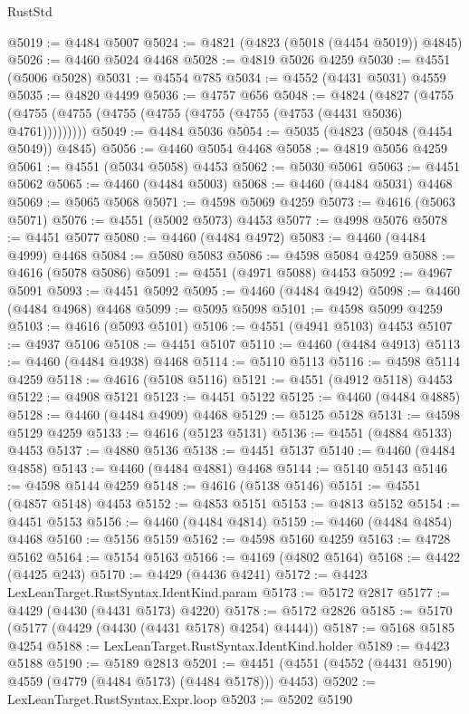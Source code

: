 \begin{lexlean}{RustStd}
\begin{coremodule}
@5019 := @4484 @5007
@5024 := @4821 (@4823 (@5018 (@4454 @5019)) @4845)
@5026 := @4460 @5024 @4468
@5028 := @4819 @5026 @4259
@5030 := @4551 (@5006 @5028)
@5031 := @4554 @785
@5034 := @4552 (@4431 @5031) @4559
@5035 := @4820 @4499
@5036 := @4757 @656
@5048 := @4824
    (@4827 (@4755 (@4755 (@4755 (@4755 (@4755 (@4755 (@4755 (@4753 (@4431 @5036) @4761)))))))))
@5049 := @4484 @5036
@5054 := @5035 (@4823 (@5048 (@4454 @5049)) @4845)
@5056 := @4460 @5054 @4468
@5058 := @4819 @5056 @4259
@5061 := @4551 (@5034 @5058) @4453
@5062 := @5030 @5061
@5063 := @4451 @5062
@5065 := @4460 (@4484 @5003)
@5068 := @4460 (@4484 @5031) @4468
@5069 := @5065 @5068
@5071 := @4598 @5069 @4259
@5073 := @4616 (@5063 @5071)
@5076 := @4551 (@5002 @5073) @4453
@5077 := @4998 @5076
@5078 := @4451 @5077
@5080 := @4460 (@4484 @4972)
@5083 := @4460 (@4484 @4999) @4468
@5084 := @5080 @5083
@5086 := @4598 @5084 @4259
@5088 := @4616 (@5078 @5086)
@5091 := @4551 (@4971 @5088) @4453
@5092 := @4967 @5091
@5093 := @4451 @5092
@5095 := @4460 (@4484 @4942)
@5098 := @4460 (@4484 @4968) @4468
@5099 := @5095 @5098
@5101 := @4598 @5099 @4259
@5103 := @4616 (@5093 @5101)
@5106 := @4551 (@4941 @5103) @4453
@5107 := @4937 @5106
@5108 := @4451 @5107
@5110 := @4460 (@4484 @4913)
@5113 := @4460 (@4484 @4938) @4468
@5114 := @5110 @5113
@5116 := @4598 @5114 @4259
@5118 := @4616 (@5108 @5116)
@5121 := @4551 (@4912 @5118) @4453
@5122 := @4908 @5121
@5123 := @4451 @5122
@5125 := @4460 (@4484 @4885)
@5128 := @4460 (@4484 @4909) @4468
@5129 := @5125 @5128
@5131 := @4598 @5129 @4259
@5133 := @4616 (@5123 @5131)
@5136 := @4551 (@4884 @5133) @4453
@5137 := @4880 @5136
@5138 := @4451 @5137
@5140 := @4460 (@4484 @4858)
@5143 := @4460 (@4484 @4881) @4468
@5144 := @5140 @5143
@5146 := @4598 @5144 @4259
@5148 := @4616 (@5138 @5146)
@5151 := @4551 (@4857 @5148) @4453
@5152 := @4853 @5151
@5153 := @4813 @5152
@5154 := @4451 @5153
@5156 := @4460 (@4484 @4814)
@5159 := @4460 (@4484 @4854) @4468
@5160 := @5156 @5159
@5162 := @4598 @5160 @4259
@5163 := @4728 @5162
@5164 := @5154 @5163
@5166 := @4169 (@4802 @5164)
@5168 := @4422 (@4425 @243)
@5170 := @4429 (@4436 @4241)
@5172 := @4423 LexLeanTarget.RustSyntax.IdentKind.param
@5173 := @5172 @2817
@5177 := @4429 (@4430 (@4431 @5173) @4220)
@5178 := @5172 @2826
@5185 := @5170 (@5177 (@4429 (@4430 (@4431 @5178) @4254) @4444))
@5187 := @5168 @5185 @4254
@5188 := LexLeanTarget.RustSyntax.IdentKind.holder
@5189 := @4423 @5188
@5190 := @5189 @2813
@5201 := @4451 (@4551 (@4552 (@4431 @5190) @4559 (@4779 (@4484 @5173) (@4484 @5178))) @4453)
@5202 := LexLeanTarget.RustSyntax.Expr.loop
@5203 := @5202 @5190

\end{coremodule}
\end{lexlean}
